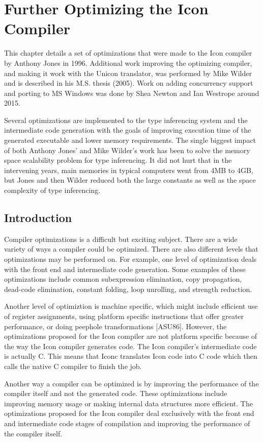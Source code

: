 \chapter{Further Optimizing the Icon Compiler}

This chapter details a set of optimizations that were made to the Icon
compiler by Anthony Jones in 1996. Additional work improving the
optimizing compiler, and making it work with the Unicon translator,
was performed by Mike Wilder and is described in his M.S. thesis (2005).
Work on adding concurrency support and porting to MS Windows was
done by Shea Newton and Ian Westrope around 2015.

Several optimizations are implemented to the type inferencing system
and the intermediate code generation with the goals of improving
execution time of the generated executable and lower memory
requirements. The single biggest impact of both Anthony Jones' and
Mike Wilder's work has been to solve the memory space scalability
problem for type inferencing. It did not hurt that in the intervening
years, main memories in typical computers went from 4MB to 4GB, but
Jones and then Wilder reduced both the large constants as well as the
space complexity of type inferencing.

\section{Introduction}

Compiler optimizations is a difficult but exciting subject. There are
a wide variety of ways a compiler could be optimized. There are also
different levels that optimizations may be performed on. For example,
one level of optimization deals with the front end and intermediate
code generation. Some examples of these optimizations include common
subexpression elimination, copy propagation, dead-code elimination,
constant folding, loop unrolling, and strength reduction.

Another level of optimiztion is machine specific, which might include
efficient use of register assignments, using platform specific
instructions that offer greater performance, or doing peephole
transformations [ASU86]. However, the optimizations proposed for the
Icon compiler are not platform specific because of the way the Icon
compiler generates code. The Icon compiler's intermediate code is
actually C. This means that Iconc translates Icon code into C code
which then calls the native C compiler to finish the job.

Another way a compiler can be optimized is by improving the
performance of the compiler itself and not the generated code. These
optimizations include improving memory usage or making internal data
structures more efficient.  The optimizations proposed for the Icon
compiler deal exclusively with the front end and intermediate code
stages of compilation and improving the performance of the compiler
itself.


